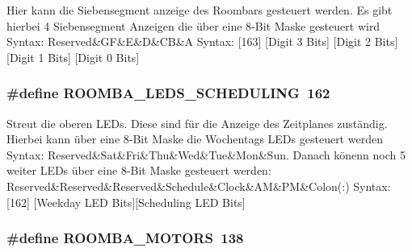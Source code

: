 Hier kann die Siebensegment anzeige des Roombars gesteuert werden. Es gibt hierbei 4 Siebensegment Anzeigen die über eine 8-\/\-Bit Maske gesteuert wird Syntax\-: Reserved\&G\-F\&E\&D\&C\-B\&A Syntax\-: \mbox{[}163\mbox{]} \mbox{[}Digit 3 Bits\mbox{]} \mbox{[}Digit 2 Bits\mbox{]} \mbox{[}Digit 1 Bits\mbox{]} \mbox{[}Digit 0 Bits\mbox{]} \hypertarget{group__roomba__commands__motor_ga9c8923fd04b3275a57ca487f34990743}{
\subsubsection[{R\-O\-O\-M\-B\-A\-\_\-\-L\-E\-D\-S\-\_\-\-S\-C\-H\-E\-D\-U\-L\-I\-N\-G}]{\setlength{\rightskip}{0pt plus 5cm}\#define R\-O\-O\-M\-B\-A\-\_\-\-L\-E\-D\-S\-\_\-\-S\-C\-H\-E\-D\-U\-L\-I\-N\-G~162}}\label{group__roomba__commands__motor_ga9c8923fd04b3275a57ca487f34990743}
Streut die oberen L\-E\-Ds. Diese sind für die Anzeige des Zeitplanes zuständig. Hierbei kann über eine 8-\/\-Bit Maske die Wochentags L\-E\-Ds gesteuert werden Syntax\-: Reserved\&Sat\&Fri\&Thu\&Wed\&Tue\&Mon\&Sun. Danach könenn noch 5 weiter L\-E\-Ds über eine 8-\/\-Bit Maske gesteuert werden\-: Reserved\&Reserved\&Reserved\&Schedule\&Clock\&A\-M\&P\-M\&Colon(\-:) Syntax\-: \mbox{[}162\mbox{]} \mbox{[}Weekday L\-E\-D Bits\mbox{]}\mbox{[}Scheduling L\-E\-D Bits\mbox{]} \hypertarget{group__roomba__commands__motor_gadf0186e2adef9b3aa86daf2deb35e0ff}{
\subsubsection[{R\-O\-O\-M\-B\-A\-\_\-\-M\-O\-T\-O\-R\-S}]{\setlength{\rightskip}{0pt plus 5cm}\#define R\-O\-O\-M\-B\-A\-\_\-\-M\-O\-T\-O\-R\-S~138}}\label{group__roomba__commands__motor_gadf0186e2adef9b3aa86daf2deb35e0ff}
